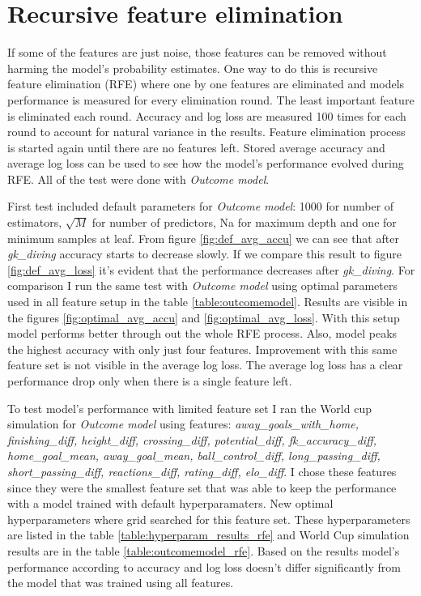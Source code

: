 \section{Recursive feature elimination}
If some of the features are just noise, those features can be removed without harming the model's probability estimates. One way to do this is recursive feature elimination (RFE) where one by one features are eliminated and models performance is measured for every elimination round. The least important feature is eliminated each round. Accuracy and log loss are measured 100 times for each round to account for natural variance in the results. Feature elimination process is started again until there are no features left. Stored average accuracy and average log loss can be used to see how the model's performance evolved during RFE. All of the test were done with \textit{Outcome model}.

First test included default parameters for \textit{Outcome model}: 1000 for number of estimators, $\sqrt{M}$ for number of predictors, Na for maximum depth and one for minimum samples at leaf. From figure \ref{fig:def_avg_accu} we can see that after \textit{gk\_diving} accuracy starts to decrease slowly. If we compare this result to figure \ref{fig:def_avg_loss}
it's evident that the performance decreases after \textit{gk\_diving}. For comparison I run the same test with \textit{Outcome model} using optimal parameters used in all feature setup in the table \ref{table:outcomemodel}. Results are visible in the figures \ref{fig:optimal_avg_accu} and \ref{fig:optimal_avg_loss}. With this setup model performs better through out the whole RFE process. Also, model peaks the highest accuracy with only just four features. Improvement with this same feature set is not visible in the average log loss. The average log loss has a clear performance drop only when there is a single feature left.

To test model's performance with limited feature set I ran the World cup simulation for \textit{Outcome model} using features: \textit{away\_goals\_with\_home, finishing\_diff, height\_diff, crossing\_diff, potential\_diff, fk\_accuracy\_diff, home\_goal\_mean, away\_goal\_mean, ball\_control\_diff, long\_passing\_diff,  short\_passing\_diff, reactions\_diff, rating\_diff, elo\_diff}. I chose these features since they were the smallest feature set that was able to keep the performance with a model trained with default hyperparamaters. New optimal hyperparameters where grid searched for this feature set. These hyperparameters are listed in the table \ref{table:hyperparam_results_rfe} and World Cup simulation results are in the table \ref{table:outcomemodel_rfe}. Based on the results model's performance according to accuracy and log loss doesn't differ significantly from the model that was trained using all features.


